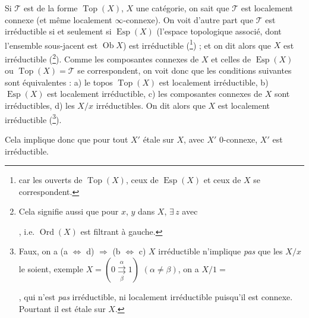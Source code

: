 Si $\mathcal{T}$ est de la forme $\operatorname{Top}(X)$, $X$ une catégorie, on sait que $\mathcal{T}$ est localement connexe (et même localement $\infty$-connexe). On voit d'autre part que $\mathcal{T}$ est irréductible si et seulement si $\operatorname{Esp}(X)$ (l'espace topologique associé, dont l'ensemble sous-jacent est $\operatorname{Ob} X$) est irréductible (\footnote[8]{car les ouverts de $\operatorname{Top}(X)$, ceux de $\operatorname{Esp}(X)$ et ceux de $X$ se correspondent.}) ; et on dit alors que $X$ est irréductible (\footnote[9]{Cela signifie aussi que pour $x$, $y$ dans $X$, $\exists\, z$ avec , i.e. $\operatorname{Ord}(X)$ est filtrant à gauche.}). Comme les composantes connexes de $X$ et celles de $\operatorname{Esp}(X)$ ou $\operatorname{Top}(X) = \mathcal{T}$ se correspondent, on voit donc que les conditions suivantes sont équivalentes : a) le topos $\operatorname{Top}(X)$ est localement irréductible, b)
$\operatorname{Esp}(X)$ est localement irréductible, c) les composantes connexes de $X$ sont irréductibles, d) les $X/x$ irréductibles. On dit alors que $X$ est localement irréductible (\footnote[10]{Faux, on a (a $\Longleftrightarrow$ d) $\Longrightarrow$ (b $\Longleftrightarrow$ c) $X$ irréductible n'implique \textit{pas} que les $X/x$ le soient, exemple $X = (0 \overset{\alpha}{\underset{\beta}{\rightrightarrows}} 1)$ $(\alpha \neq \beta)$, on a $X/1 =$ , qui n'est \textit{pas} irréductible, ni localement irréductible puisqu'il est connexe. Pourtant il est étale sur $X$.}).

Cela implique donc que pour tout $X'$ étale sur $X$, avec $X'$ 0-connexe, $X'$ est irréductible.

